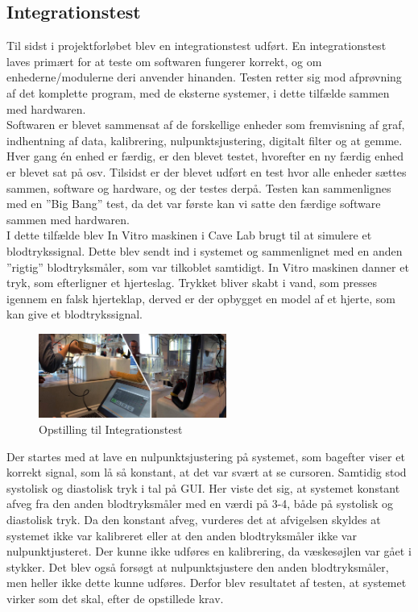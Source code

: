 \subsection{Integrationstest}
Til sidst i projektforløbet blev en integrationstest\cite{Integration} udført. En integrationstest laves primært for at teste om softwaren fungerer korrekt, og om enhederne/modulerne deri anvender hinanden. Testen retter sig mod afprøvning af det komplette program, med de eksterne systemer, i dette tilfælde sammen med hardwaren.\\
Softwaren er blevet sammensat af de forskellige enheder som fremvisning af graf, indhentning af data, kalibrering, nulpunktsjustering, digitalt filter og at gemme. Hver gang én enhed er færdig, er den blevet testet, hvorefter en ny færdig enhed er blevet sat på osv. Tilsidst er der blevet udført en test hvor alle enheder sættes sammen, software og hardware,  og der testes derpå. Testen kan sammenlignes med en ”Big Bang” test, da det var første kan vi satte den færdige software sammen med hardwaren.\\  
I dette tilfælde blev In Vitro maskinen i Cave Lab brugt til at simulere et blodtrykssignal. Dette blev sendt ind i systemet og sammenlignet med en anden ”rigtig” blodtryksmåler, som var tilkoblet samtidigt. In Vitro maskinen danner et tryk, som efterligner et hjerteslag. Trykket bliver skabt i vand, som presses igennem en falsk hjerteklap, derved er der opbygget en model af et hjerte, som kan give et blodtrykssignal. 

\begin{figure}[H]
	\centering
	\includegraphics[width=0.55\textwidth]{Figurer/integration_opstilling}
	\caption{Opstilling til Integrationstest}
	\label{fig:Integration_opstilling}
\end{figure}

Der startes med at lave en nulpunktsjustering på systemet, som bagefter viser et korrekt signal, som lå så konstant, at det var svært at se cursoren. Samtidig stod systolisk og diastolisk tryk i tal på GUI. Her viste det sig, at systemet konstant afveg fra den anden blodtryksmåler med en værdi på 3-4, både på systolisk og diastolisk tryk. Da den konstant afveg, vurderes det at afvigelsen skyldes at systemet ikke var kalibreret eller at den anden blodtryksmåler ikke var nulpunktjusteret. Der kunne ikke udføres en kalibrering, da væskesøjlen var gået i stykker. Det blev også forsøgt at nulpunktsjustere den anden blodtryksmåler, men heller ikke dette kunne udføres. Derfor blev resultatet af testen, at systemet virker som det skal, efter de opstillede krav.  

